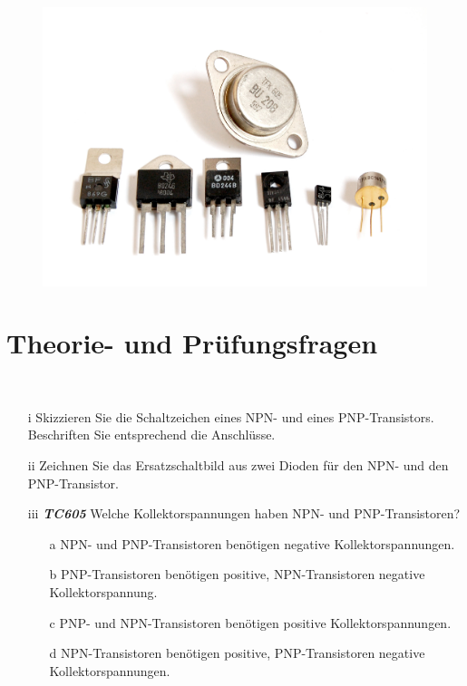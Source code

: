 

\begin{figure}
 \vspace{-6cm}
  \includegraphics[scale=0.4]{Transistor/Bilder/Transistors-white.jpg}
 \vspace{-6cm}
\end{figure}

\section{Theorie- und Prüfungsfragen}

~~~~~~

\begin{enumerate}
\itemsep1pt\parskip0pt
\item[i] Skizzieren Sie die Schaltzeichen eines NPN- und eines PNP-Transistors. Beschriften Sie entsprechend die Anschlüsse.
\item[ii] Zeichnen Sie das Ersatzschaltbild aus zwei Dioden für den NPN- und den PNP-Transistor.
\end{enumerate}

\begin{enumerate} 
\item[iii] \emph{\textbf{TC605}} Welche Kollektorspannungen haben NPN- und PNP-Transistoren?
	\begin{enumerate}
	\itemsep1pt\parskip0pt
		\item[a] NPN- und PNP-Transistoren benötigen negative Kollektorspannungen.
		\item[b] PNP-Transistoren benötigen positive, NPN-Transistoren negative Kollektorspannung.
		\item[c] PNP- und NPN-Transistoren benötigen positive Kollektorspannungen.
		\item[d] NPN-Transistoren benötigen positive, PNP-Transistoren negative Kollektorspannungen.
	\end{enumerate}
\end{enumerate}


